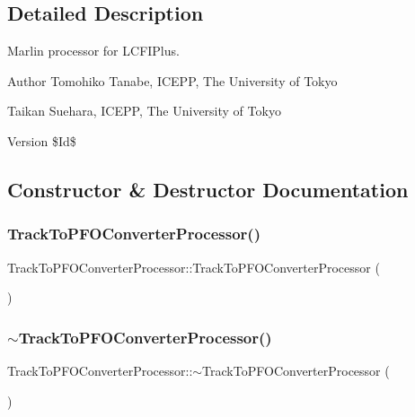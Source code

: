 \subsection{Detailed Description}
Marlin processor for L\+C\+F\+I\+Plus. 

\begin{DoxyAuthor}{Author}
Tomohiko Tanabe, I\+C\+E\+PP, The University of Tokyo 

Taikan Suehara, I\+C\+E\+PP, The University of Tokyo 
\end{DoxyAuthor}
\begin{DoxyVersion}{Version}
\$\+Id\$ 
\end{DoxyVersion}


\subsection{Constructor \& Destructor Documentation}
\mbox{\label{classTrackToPFOConverterProcessor_af8b94a550680eed57d83a6244c64b823}} 
\subsubsection{Track\+To\+P\+F\+O\+Converter\+Processor()}
{\footnotesize\ttfamily Track\+To\+P\+F\+O\+Converter\+Processor\+::\+Track\+To\+P\+F\+O\+Converter\+Processor (\begin{DoxyParamCaption}{ }\end{DoxyParamCaption})}

\mbox{\label{classTrackToPFOConverterProcessor_a38e4a17cc17b3d24345018f63652c0c2}} 
\subsubsection{$\sim$\+Track\+To\+P\+F\+O\+Converter\+Processor()}
{\footnotesize\ttfamily Track\+To\+P\+F\+O\+Converter\+Processor\+::$\sim$\+Track\+To\+P\+F\+O\+Converter\+Processor (\begin{DoxyParamCaption}{ }\end{DoxyParamCaption})\hspace{0.3cm}{\ttfamily [virtual]}}




